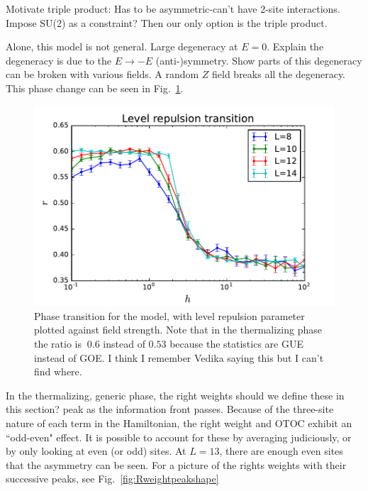 \documentclass[aps,prl,reprint,superscriptaddress, longbibliography]{revtex4-1}
\newcommand{\charlie}[1]{ {\color{Magenta} {{#1}}}}
\begin{document}
Motivate triple product:
Has to be asymmetric-can't have 2-site interactions.
Impose SU(2) as a constraint?
Then our only option is the triple product.

Alone, this model is not general.
Large degeneracy at $E=0$. 
Explain the degeneracy is due to the $E\to -E$ (anti-)symmetry.
Show parts of this degeneracy can be broken with various fields.
A random $Z$ field breaks all the degeneracy.
This phase change can be seen in Fig.~\ref{fig:levelrepultrans}.

\begin{figure}
	\includegraphics[width=\columnwidth]{levelrepultrans}
	\caption{Phase transition for the model, with level repulsion parameter plotted against field strength. Note that in the thermalizing phase the ratio is $~0.6$ instead of $0.53$ because the statistics are GUE instead of GOE. \charlie{I think I remember Vedika saying this but I can't find where.}}
	\label{fig:levelrepultrans}
\end{figure}

In the thermalizing, generic phase, the right weights \charlie{should we define these in this section?} peak as the information front passes. Because of the three-site nature of each term in the Hamiltonian, the right weight and OTOC exhibit an ``odd-even" effect. It is possible to account for these by averaging judiciously, or by only looking at even (or odd) sites. At $L=13$, there are enough even sites that the asymmetry can be seen. For a picture of the rights weights with their successive peaks, see Fig.~\ref{fig:Rweightpeakshape}
\end{document}
